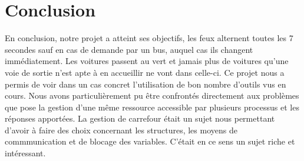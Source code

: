 \section*{Conclusion}
En conclusion, notre projet a atteint ses objectifs, les feux alternent toutes les 7 secondes sauf en cas de demande par un bus, auquel cas ils changent immédiatement. Les voitures passent au vert et jamais plus de voitures qu'une voie de sortie n'est apte à en accueillir ne vont dans celle-ci.
Ce projet nous a permis de voir dans un cas concret l'utilisation de bon nombre d'outils vus en cours. Nous avons particulièrement pu être confrontés directement aux problèmes que pose la gestion d'une même ressource accessible par plusieurs processus et les réponses apportées. La gestion de carrefour était un sujet nous permettant d'avoir à faire des choix concernant les structures, les moyens de commmunication et de blocage des variables. C'était en ce sens un sujet riche et intéressant.
